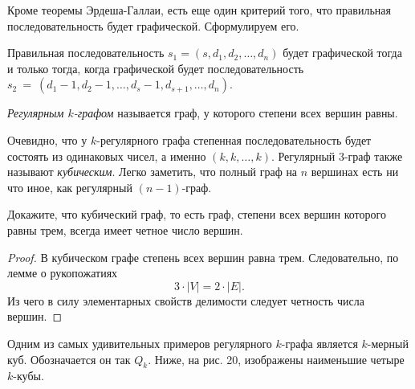 Кроме теоремы Эрдеша-Галлаи, есть еще один критерий того, что правильная последовательность будет графической. Сформулируем его.

\begin{statement}
	Правильная последовательность $s_1 = (s, d_1, d_2, \dots, d_n)$ будет графической тогда и только тогда, 
	когда графической будет последовательность $s_2~=~(d_1 - 1, d_2 - 1, \dots, d_s - 1, d_{s+1}, \dots, d_n)$.
\end{statement}

\begin{definition}
	\emph{Регулярным $k$-графом} называется граф, у которого степени всех вершин равны.
\end{definition}

	Очевидно, что у $k$-регулярного графа степенная последовательность будет состоять из одинаковых чисел, а именно $(k, k, \dots, k)$. 
	Регулярный 3-граф также называют \emph{кубическим}. Легко заметить, что полный граф на $n$ вершинах есть ни что иное, как регулярный $(n-1)$-граф.

\begin{example}
	Докажите, что кубический граф, то есть граф, степени всех вершин которого  равны трем, всегда имеет четное число вершин.
	
	\begin{proof}
		В кубическом графе степень всех вершин равна трем. Следовательно, по лемме о рукопожатиях
		$$3 \cdot |V| = 2 \cdot |E|.$$
		Из чего в силу элементарных свойств делимости следует четность числа вершин.
	\end{proof}
\end{example}

	Одним из самых удивительных примеров регулярного $k$-графа является $k$-мерный куб. Обозначается он так $Q_k$. 
	Ниже, на рис. 20, изображены наименьшие четыре $k$-кубы.

